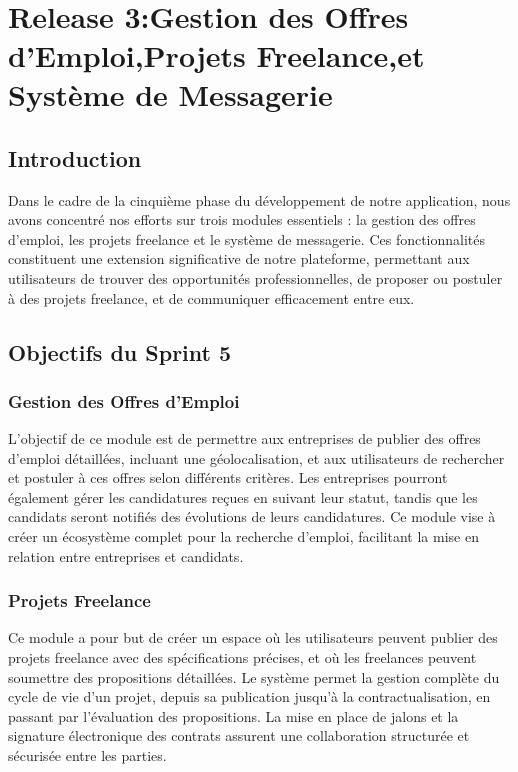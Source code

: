 ﻿﻿

\chapter{Release 3:Gestion des Offres d'Emploi,Projets Freelance,et Système de Messagerie }

\DeclareRobustCommand{\greencheck}{%
  \tikz\fill[scale=0.4, color=green]
  (0,.35) -- (.25,0) -- (1,.7) -- (.25,.15) -- cycle;%
}

\minitoc
\newpage
\section*{Introduction}
Dans le cadre de la cinquième phase du développement de notre application, nous avons concentré nos efforts sur trois modules essentiels : la gestion des offres d'emploi, les projets freelance et le système de messagerie. Ces fonctionnalités constituent une extension significative de notre plateforme, permettant aux utilisateurs de trouver des opportunités professionnelles, de proposer ou postuler à des projets freelance, et de communiquer efficacement entre eux.

\section{Objectifs du Sprint 5}

\subsection{Gestion des Offres d'Emploi}
L'objectif de ce module est de permettre aux entreprises de publier des offres d'emploi détaillées, incluant une géolocalisation, et aux utilisateurs de rechercher et postuler à ces offres selon différents critères. Les entreprises pourront également gérer les candidatures reçues en suivant leur statut, tandis que les candidats seront notifiés des évolutions de leurs candidatures. Ce module vise à créer un écosystème complet pour la recherche d'emploi, facilitant la mise en relation entre entreprises et candidats.

\subsection{Projets Freelance}
Ce module a pour but de créer un espace où les utilisateurs peuvent publier des projets freelance avec des spécifications précises, et où les freelances peuvent soumettre des propositions détaillées. Le système permet la gestion complète du cycle de vie d'un projet, depuis sa publication jusqu'à la contractualisation, en passant par l'évaluation des propositions. La mise en place de jalons et la signature électronique des contrats assurent une collaboration structurée et sécurisée entre les parties.

